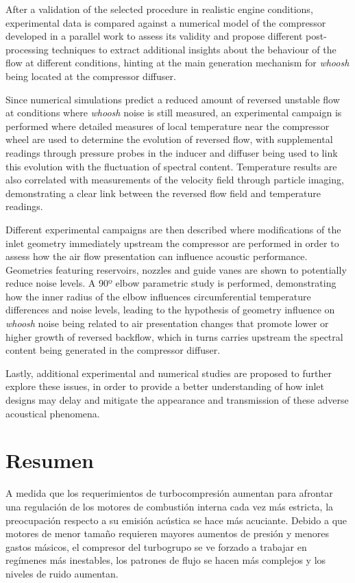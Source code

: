 After a validation of the selected procedure in realistic engine conditions, experimental data is compared against a numerical model of the compressor developed in a parallel work to assess its validity and propose different post-processing techniques to extract additional insights about the behaviour of the flow at different conditions, hinting at the main generation mechanism for \emph{whoosh} being located at the compressor diffuser.

Since numerical simulations predict a reduced amount of reversed unstable flow at conditions where \emph{whoosh} noise is still measured, an experimental campaign is performed where detailed measures of local temperature near the compressor wheel are used to determine the evolution of reversed flow, with supplemental readings through pressure probes in the inducer and diffuser being used to link this evolution with the fluctuation of spectral content. Temperature results are also correlated with measurements of the velocity field through particle imaging, demonstrating a clear link between the reversed flow field and temperature readings.

Different experimental campaigns are then described where modifications of the inlet geometry immediately upstream the compressor are performed in order to assess how the air flow presentation can influence acoustic performance. Geometries featuring reservoirs, nozzles and guide vanes are shown to potentially reduce noise levels. A 90º elbow parametric study is performed, demonstrating how the inner radius of the elbow influences circumferential temperature differences and noise levels, leading to the hypothesis of geometry influence on \emph{whoosh} noise being related to air presentation changes that promote lower or higher growth of reversed backflow, which in turns carries upstream the spectral content being generated in the compressor diffuser.

Lastly, additional experimental and numerical studies are proposed to further explore these issues, in order to provide a better understanding of how inlet designs may delay and mitigate the appearance and transmission of these adverse acoustical phenomena.

\cleardoublepage

\chapter*{Resumen}
A medida que los requerimientos de turbocompresión aumentan para afrontar una regulación de los motores de combustión interna cada vez más estricta, la preocupación respecto a su emisión acústica se hace más acuciante. Debido a que motores de menor tamaño requieren mayores aumentos de presión y menores gastos másicos, el compresor del turbogrupo se ve forzado a trabajar en regímenes más inestables, los patrones de flujo se hacen más complejos y los niveles de ruido aumentan.


